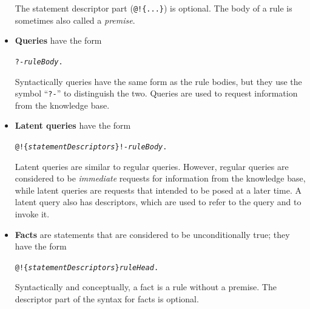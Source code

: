 \documentclass[11pt]{article}
\begin{document}
\begin{itemize}
  The statement descriptor part
  (\texttt{@!\{...\}})  is optional. The body of a rule is sometimes also
  called a \emph{premise}. 
\item \textbf{Queries} have the form\\
\begin{alltt}
     ?- \emph{ruleBody}.
\end{alltt}
  Syntactically queries have the same form as the rule bodies, but they use
  the symbol ``\texttt{?-}''  to distinguish the two. Queries are
  used to request information from the knowledge base.
\item \textbf{Latent queries} have the form\\
\begin{alltt}
     @!\{\emph{statementDescriptors}\}  !- \emph{ruleBody}.
\end{alltt}
  Latent queries are similar to regular queries. However, regular
  queries are considered to be \emph{immediate} requests for information
  from the knowledge base, while latent queries are requests that intended to
  be posed at a later time.  A latent query also has descriptors, which are
  used to refer to the query and to invoke it.
\item \textbf{Facts} are statements that are considered to be
  unconditionally true; they have the form\\
\begin{alltt}
     @!\{\emph{statementDescriptors}\}  \emph{ruleHead}.
\end{alltt}
  Syntactically and conceptually, a fact is a rule without a premise.
  The descriptor part of the syntax for facts is optional.
\end{itemize}
\end{document}
